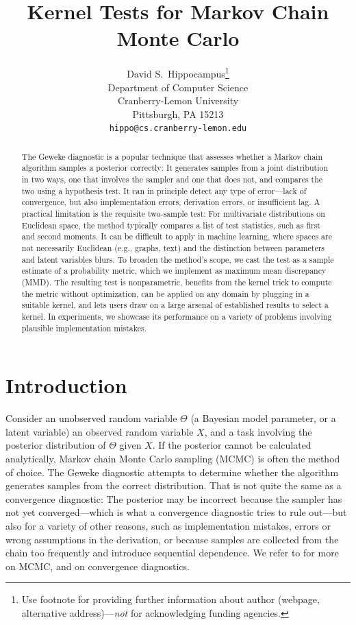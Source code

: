 \documentclass{article}
\title{Kernel Tests for Markov Chain Monte Carlo}
\author{%
  David S.~Hippocampus\thanks{Use footnote for providing further information
    about author (webpage, alternative address)---\emph{not} for acknowledging
    funding agencies.} \\
  Department of Computer Science\\
  Cranberry-Lemon University\\
  Pittsburgh, PA 15213 \\
  \texttt{hippo@cs.cranberry-lemon.edu} \\
}
\begin{document}
\maketitle

\begin{abstract}
    The Geweke diagnostic is a popular technique that assesses whether a Markov chain
  algorithm samples a posterior correctly: It
  generates samples from a joint distribution in two ways,
  one that involves the sampler and one that does not, and compares
  the two using a hypothesis test. 
  It can in principle detect any type of error---lack of
  convergence, but also implementation errors, derivation errors, or
  insufficient lag. A practical limitation is the requisite
  two-sample test: For multivariate distributions on Euclidean space, the method typically compares a list of test statistics, such as first and second moments.
  It can be difficult to apply in machine learning, where spaces are not necessarily  
  Euclidean (e.g., graphs, text) and the distinction
  between parameters and latent variables blurs. 
  To broaden the method's scope, we cast the test as a sample  estimate of a probability metric, which we implement as maximum mean discrepancy (MMD). 
  The resulting test is nonparametric,
  benefits from the kernel trick to compute the metric without
  optimization, can be applied on any domain by plugging in a suitable
  kernel, and lets users draw on a large arsenal of established
  results to select a kernel. 
  In experiments, we showcase its performance on a variety of problems involving plausible implementation mistakes.
\end{abstract}

\section{Introduction}
\label{section:intro}

Consider an unobserved
random variable $\Theta$ (a Bayesian model parameter, or a latent variable)
an observed random variable $X$, and a task involving the
posterior distribution of $\Theta$ given $X$. If the posterior cannot
be calculated analytically, Markov chain Monte Carlo sampling
(MCMC) is often the method of choice.
The Geweke diagnostic \cite{geweke_getting_2004} attempts to determine
whether the algorithm generates samples from the correct distribution.
That is not quite the same as a convergence diagnostic: The posterior
may be incorrect because the sampler has not yet converged---which is
what a convergence diagnostic tries to rule out---but also for a
variety of other reasons, such as 
implementation mistakes, errors or wrong assumptions in the
derivation, or because samples are collected from the chain too
frequently and introduce sequential dependence.
We refer to \citep{Robert:Casella} for more on MCMC, and on
convergence diagnostics.
\end{document}
